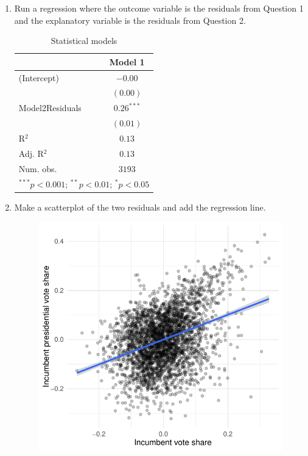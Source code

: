 \documentclass[12pt,letterpaper]{article}
\begin{document}
	\begin{enumerate}
		\item Run a regression where the outcome variable is the residuals from Question 1 and the explanatory variable is the residuals from Question 2.	
		
						 
						
						\begin{table}[H]
\begin{center}
\begin{tabular}{l c}
\hline
 & Model 1 \\
\hline
(Intercept)     & $-0.00$      \\
                & $(0.00)$     \\
Model2Residuals & $0.26^{***}$ \\
                & $(0.01)$     \\
\hline
R$^2$           & $0.13$       \\
Adj. R$^2$      & $0.13$       \\
Num. obs.       & $3193$       \\
\hline
\multicolumn{2}{l}{\scriptsize{$^{***}p<0.001$; $^{**}p<0.01$; $^{*}p<0.05$}}
\end{tabular}
\caption{Statistical models}
\label{table:coefficients}
\end{center}
\end{table}

		\item Make a scatterplot of the two residuals and add the regression line. 	\
		
						 \vspace{7cm}
						
						\begin{figure}[h!]  
    \centering
    \includegraphics{Question5plot.pdf}  
\end{figure}


\end{enumerate}
\end{document}
